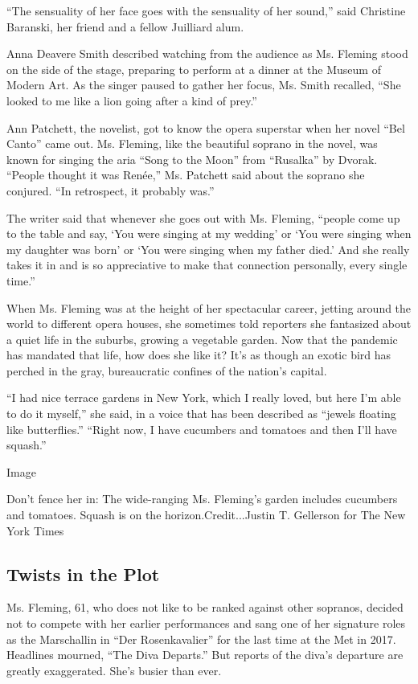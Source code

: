 ``The sensuality of her face goes with the sensuality of her sound,''
said Christine Baranski, her friend and a fellow Juilliard alum.

Anna Deavere Smith described watching from the audience as Ms. Fleming
stood on the side of the stage, preparing to perform at a dinner at the
Museum of Modern Art. As the singer paused to gather her focus, Ms.
Smith recalled, ``She looked to me like a lion going after a kind of
prey.''

Ann Patchett, the novelist, got to know the opera superstar when her
novel ``Bel Canto'' came out. Ms. Fleming, like the beautiful soprano in
the novel, was known for singing the aria ``Song to the Moon'' from
``Rusalka'' by Dvorak. ``People thought it was Renée,'' Ms. Patchett
said about the soprano she conjured. ``In retrospect, it probably was.''

The writer said that whenever she goes out with Ms. Fleming, ``people
come up to the table and say, `You were singing at my wedding' or `You
were singing when my daughter was born' or `You were singing when my
father died.' And she really takes it in and is so appreciative to make
that connection personally, every single time.''

When Ms. Fleming was at the height of her spectacular career, jetting
around the world to different opera houses, she sometimes told reporters
she fantasized about a quiet life in the suburbs, growing a vegetable
garden. Now that the pandemic has mandated that life, how does she like
it? It's as though an exotic bird has perched in the gray, bureaucratic
confines of the nation's capital.

``I had nice terrace gardens in New York, which I really loved, but here
I'm able to do it myself,'' she said, in a voice that has been described
as ``jewels floating like butterflies.'' ``Right now, I have cucumbers
and tomatoes and then I'll have squash.''

Image

Don't fence her in: The wide-ranging Ms. Fleming's garden includes
cucumbers and tomatoes. Squash is on the horizon.Credit...Justin T.
Gellerson for The New York Times

\hypertarget{twists-in-the-plot}{%
\subsection{Twists in the Plot}\label{twists-in-the-plot}}

Ms. Fleming, 61, who does not like to be ranked against other sopranos,
decided not to compete with her earlier performances and sang one of her
signature roles as the Marschallin in ``Der Rosenkavalier'' for the last
time at the Met in 2017. Headlines mourned, ``The Diva Departs.'' But
reports of the diva's departure are greatly exaggerated. She's busier
than ever.

